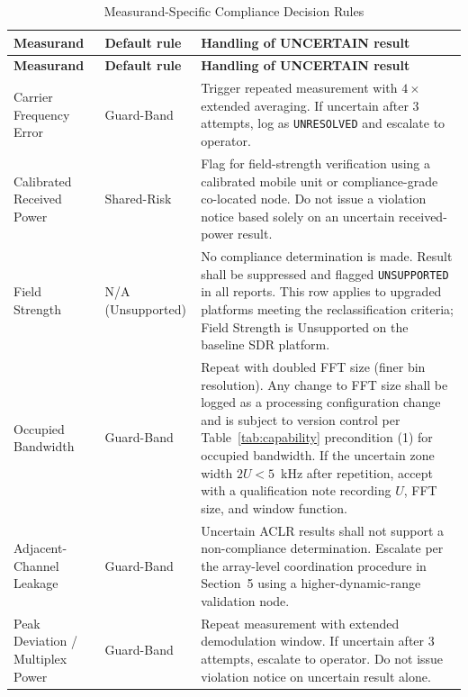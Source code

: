 \documentclass[11pt]{article}
\begin{document}
\begin{longtable}{L{3.0cm}L{2.2cm}L{8.6cm}}
\caption{Measurand-Specific Compliance Decision Rules}
\label{tab:decision-rules}\\
\toprule
{}
\textbf{Measurand} & \textbf{Default rule} & \textbf{Handling of UNCERTAIN result} \\
\midrule
\endfirsthead
\toprule
{}
\textbf{Measurand} & \textbf{Default rule} & \textbf{Handling of UNCERTAIN result} \\
\midrule
\endhead
\bottomrule
\endfoot

Carrier Frequency Error & Guard-Band &
Trigger repeated measurement with $4\times$ extended averaging. If uncertain after 3 attempts, log as \texttt{UNRESOLVED} and escalate to operator. \\

Calibrated Received Power & Shared-Risk &
Flag for field-strength verification using a calibrated mobile unit or compliance-grade co-located node. Do not issue a violation notice based solely on an uncertain received-power result. \\

Field Strength & N/A (Unsupported) &
No compliance determination is made. Result shall be suppressed and flagged \texttt{UNSUPPORTED} in all reports. This row applies to upgraded platforms meeting the reclassification criteria; Field Strength is Unsupported on the baseline SDR platform. \\

Occupied Bandwidth & Guard-Band &
Repeat with doubled FFT size (finer bin resolution). Any change to FFT size shall be logged as a processing configuration change and is subject to version control per Table~\ref{tab:capability} precondition (1) for occupied bandwidth. If the uncertain zone width $2U < 5$~kHz after repetition, accept with a qualification note recording $U$, FFT size, and window function. \\

Adjacent-Channel Leakage & Guard-Band &
Uncertain ACLR results shall not support a non-compliance determination. Escalate per the array-level coordination procedure in Section~5 using a higher-dynamic-range validation node. \\

Peak Deviation / Multiplex Power & Guard-Band &
Repeat measurement with extended demodulation window. If uncertain after 3 attempts, escalate to operator. Do not issue violation notice on uncertain result alone. \\


\end{longtable}
\end{document}
